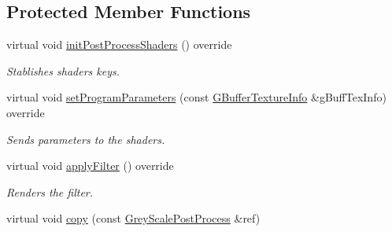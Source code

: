 \subsection*{Protected Member Functions}
\begin{DoxyCompactItemize}
\item 
\mbox{\label{class_geometry_engine_1_1_geometry_post_process_1_1_single_pass_post_process_1_1_grey_scale_post_process_a17e5445c69b1e2f975603ba84d9b03b6}} 
virtual void \mbox{\hyperlink{class_geometry_engine_1_1_geometry_post_process_1_1_single_pass_post_process_1_1_grey_scale_post_process_a17e5445c69b1e2f975603ba84d9b03b6}{init\+Post\+Process\+Shaders}} () override
\begin{DoxyCompactList}\small\item\em Stablishes shaders keys. \end{DoxyCompactList}\item 
\mbox{\label{class_geometry_engine_1_1_geometry_post_process_1_1_single_pass_post_process_1_1_grey_scale_post_process_ab60a2926e4d28cb0b808a3e01bbe85d3}} 
virtual void \mbox{\hyperlink{class_geometry_engine_1_1_geometry_post_process_1_1_single_pass_post_process_1_1_grey_scale_post_process_ab60a2926e4d28cb0b808a3e01bbe85d3}{set\+Program\+Parameters}} (const \mbox{\hyperlink{struct_geometry_engine_1_1_g_buffer_texture_info}{G\+Buffer\+Texture\+Info}} \&g\+Buff\+Tex\+Info) override
\begin{DoxyCompactList}\small\item\em Sends parameters to the shaders. \end{DoxyCompactList}\item 
\mbox{\label{class_geometry_engine_1_1_geometry_post_process_1_1_single_pass_post_process_1_1_grey_scale_post_process_abfa5e2162bb4300ec4fea1b36873d786}} 
virtual void \mbox{\hyperlink{class_geometry_engine_1_1_geometry_post_process_1_1_single_pass_post_process_1_1_grey_scale_post_process_abfa5e2162bb4300ec4fea1b36873d786}{apply\+Filter}} () override
\begin{DoxyCompactList}\small\item\em Renders the filter. \end{DoxyCompactList}\item 
virtual void \mbox{\hyperlink{class_geometry_engine_1_1_geometry_post_process_1_1_single_pass_post_process_1_1_grey_scale_post_process_ae22e2bf8dc5b553a7b1526b695c8be88}{copy}} (const \mbox{\hyperlink{class_geometry_engine_1_1_geometry_post_process_1_1_single_pass_post_process_1_1_grey_scale_post_process}{Grey\+Scale\+Post\+Process}} \&ref)
\end{DoxyCompactItemize}
